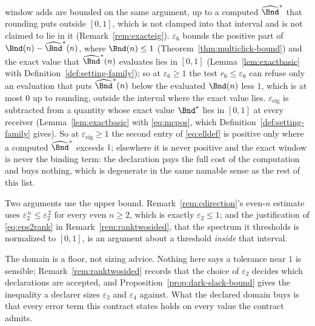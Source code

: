 \begin{remark}
window adds are bounded on the same argument, up to a computed
$\widehat\Bnd^{\ast}$ that rounding puts outside $[0,1]$, which is not clamped
into that interval and is not claimed to lie in it
(Remark~\ref{rem:exacteig}). $\varepsilon_6$ bounds the positive part of
$\Bnd(n)-\widehat\Bnd^{\ast}(n)$, where $\Bnd(n)\le1$
(Theorem~\ref{thm:multiclick-bound}) and the exact value that
$\widehat\Bnd^{\ast}(n)$ evaluates lies in $[0,1]$
(Lemma~\ref{lem:exactbasic} with Definition~\ref{def:setting-family}); so at
$\varepsilon_6\ge1$ the test $r_6\le\varepsilon_6$ can refuse only an
evaluation that puts $\widehat\Bnd^{\ast}(n)$ below the evaluated $\Bnd(n)$
less $1$, which is at most $0$ up to rounding, outside the interval where the
exact value lies. $\varepsilon_{\mathrm{eig}}$ is subtracted from a quantity
whose exact value $\Bnd^{\ast}$ lies in $[0,1]$ at every receiver
(Lemma~\ref{lem:exactbasic} with \eqref{eq:mcpos}, which
Definition~\ref{def:setting-family} gives). So at
$\varepsilon_{\mathrm{eig}}\ge1$ the second entry of \eqref{eq:elldef} is
positive only where a computed $\widehat\Bnd^{\ast}$ exceeds $1$; elsewhere it
is never positive and the exact window is never the binding term: the
declaration pays the full cost of the computation and buys nothing, which is
degenerate in the same namable sense as the rest of this list.

Two arguments use the upper bound. Remark~\ref{rem:cdirection}'s even-$n$
estimate uses $\varepsilon_2^{\,n}\le\varepsilon_2^{\,2}$ for every even
$n\ge2$, which is exactly $\varepsilon_2\le1$; and the justification of
\eqref{eq:eps2rank} in Remark~\ref{rem:ranktwosided}, that the spectrum it
thresholds is normalized to $[0,1]$, is an argument about a threshold
\emph{inside} that interval.

The domain is a floor, not sizing advice. Nothing here says a tolerance near
$1$ is sensible; Remark~\ref{rem:ranktwosided} records that the choice of
$\varepsilon_2$ decides which declarations are accepted, and
Proposition~\ref{prop:dark-slack-bound} gives the inequality a declarer sizes $\varepsilon_2$
and $\varepsilon_4$ against. What the declared domain buys is that every error
term this contract states holds on every value the contract admits.
\end{remark}
